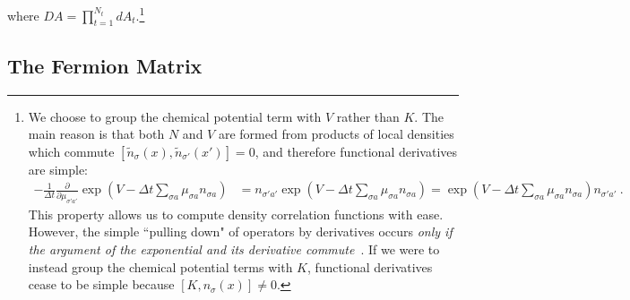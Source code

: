 where $DA = \prod_{t=1}^{N_t} d A_t $.\footnote{
	We choose to group the chemical potential term with $V$ rather than $K$.
	The main reason is that both $N$ and $V$ are formed from products of local densities which commute $[\tilde{n}_{\sigma}(x),\tilde{n}_{\sigma'}(x')] = 0$, and therefore functional derivatives are simple:
	\begin{align*}
		-\frac{1}{\Delta t} \frac{\partial}{\partial \mu_{\sigma 'a'}}\exp\left( V - \Delta t \sum_{\sigma a}\mu_{\sigma a} n_{\sigma a}\right) 
		&
		=  n_{\sigma' a'} \exp\left( V - \Delta t \sum_{\sigma a}\mu_{\sigma a} n_{\sigma a}\right)
		= \exp\left( V - \Delta t \sum_{\sigma a}\mu_{\sigma a} n_{\sigma a}\right) n_{\sigma' a'}~.
	\end{align*} 
	This property allows us to compute density correlation functions with ease.
	However, the simple ``pulling down" of operators by derivatives occurs \emph{only if the argument of the exponential and its derivative commute}~\cite{10.2307/4146900}.
	If we were to instead group the chemical potential terms with $K$, functional derivatives cease to be simple because $[K,n_{\sigma}(x)] \neq 0$.
}

\subsection{The Fermion Matrix}

